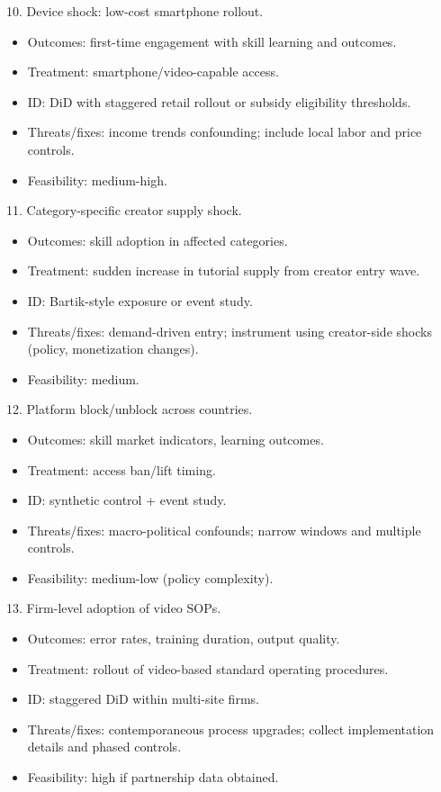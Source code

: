\documentclass[11pt]{article}
\begin{document}
10. Device shock: low-cost smartphone rollout.\\
\begin{itemize}
\item Outcomes: first-time engagement with skill learning and outcomes.
\item Treatment: smartphone/video-capable access.
\item ID: DiD with staggered retail rollout or subsidy eligibility thresholds.
\item Threats/fixes: income trends confounding; include local labor and price controls.
\item Feasibility: medium-high.
\end{itemize}

11. Category-specific creator supply shock.\\
\begin{itemize}
\item Outcomes: skill adoption in affected categories.
\item Treatment: sudden increase in tutorial supply from creator entry wave.
\item ID: Bartik-style exposure or event study.
\item Threats/fixes: demand-driven entry; instrument using creator-side shocks (policy, monetization changes).
\item Feasibility: medium.
\end{itemize}

12. Platform block/unblock across countries.\\
\begin{itemize}
\item Outcomes: skill market indicators, learning outcomes.
\item Treatment: access ban/lift timing.
\item ID: synthetic control + event study.
\item Threats/fixes: macro-political confounds; narrow windows and multiple controls.
\item Feasibility: medium-low (policy complexity).
\end{itemize}

13. Firm-level adoption of video SOPs.\\
\begin{itemize}
\item Outcomes: error rates, training duration, output quality.
\item Treatment: rollout of video-based standard operating procedures.
\item ID: staggered DiD within multi-site firms.
\item Threats/fixes: contemporaneous process upgrades; collect implementation details and phased controls.
\item Feasibility: high if partnership data obtained.
\end{itemize}
\end{document}
